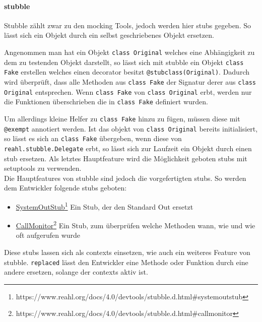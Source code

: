 \paragraph{stubble}\label{python-tools:stubble}\mbox{}
\newline
Stubble zählt zwar zu den \gls{mock}ing Tools, jedoch werden hier \Glspl{stub} gegeben.
So lässt sich ein Objekt durch ein selbst geschriebenes Objekt ersetzen.

Angenommen man hat ein Objekt \lstinline{class Original} welches eine Abhängigkeit
zu dem zu testenden Objekt darstellt, so lässt sich mit stubble ein Objekt \lstinline{class Fake}
erstellen welches einen \gls{decorator} besitzt \lstinline{@stubclass(Original)}. Dadurch
wird überprüft, dass alle Methoden aus \lstinline{class Fake} der Signatur derer aus
\lstinline{class Original} entsprechen. Wenn \lstinline{class Fake} von \lstinline{class Original}
erbt, werden nur die Funktionen überschrieben die in \lstinline{class Fake} definiert wurden.

Um allerdings kleine Helfer zu \lstinline{class Fake} hinzu zu fügen, müssen diese mit
\lstinline{@exempt} annotiert werden. Ist das objekt von \lstinline{class Original} bereits
initialisiert, so lässt es sich an \lstinline{class Fake} übergeben, wenn diese von
\lstinline{reahl.stubble.Delegate} erbt, so lässt sich zur Laufzeit ein Objekt durch
einen \Gls{stub} ersetzen. Als letztes Hauptfeature wird die Möglichkeit geboten
\Glspl{stub} mit setuptools zu verwenden.
\newline
\\
Die Hauptfeatures von stubble sind jedoch die vorgefertigten \Glspl{stub}. So werden
dem Entwickler folgende \Glspl{stub} geboten:
\begin{itemize}
    \item \href{https://www.reahl.org/docs/4.0/devtools/stubble.d.html\#systemoutstub}{SystemOutStub}\footnote{https://www.reahl.org/docs/4.0/devtools/stubble.d.html\#systemoutstub}
    \subitem Ein Stub, der den Standard Out ersetzt
    \item \href{https://www.reahl.org/docs/4.0/devtools/stubble.d.html\#callmonitor}{CallMonitor}\footnote{https://www.reahl.org/docs/4.0/devtools/stubble.d.html\#callmonitor}
    \subitem Ein Stub, zum überprüfen welche Methoden wann, wie und wie oft aufgerufen wurde
\end{itemize}

Diese \Glspl{stub} lassen sich als \glspl{context} einsetzen, wie auch ein weiteres Feature von stubble.
\lstinline{replaced} lässt den Entwickler eine Methode oder Funktion durch eine andere ersetzen,
solange der \glspl{context} aktiv ist.

